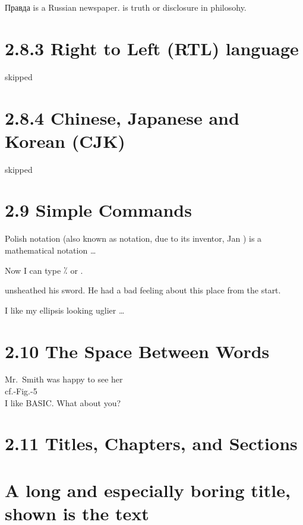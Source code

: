 \documentclass{article}
\begin{document}
\textrussian{Правда} is a Russian newspaper.
 is truth or disclosure in philosohy.

\section{2.8.3 Right to Left (RTL) language}
skipped

\section{2.8.4 Chinese, Japanese and Korean (CJK)}
skipped

\section{2.9 Simple Commands}


Polish notation (also known as \lukas{} notation, due to its inventor, Jan \lukas{})
is a mathematical notation \ldots


Now I can type ⁒ or \comminus.


\hero{} unsheathed his sword.
He had a bad feeling about
this place from the start.


I like my ellipsis looking
uglier \ldots

\section{2.10 The Space Between Words}

Mr.~Smith was happy to see her\\
cf.-Fig.-5\\
I like BASIC\@. What about you?

\section{2.11 Titles, Chapters, and Sections}
 
\tableofcontents

\section[Title for the table of contents]{A long
and especially boring title, 
shown is the text}
\end{document}
